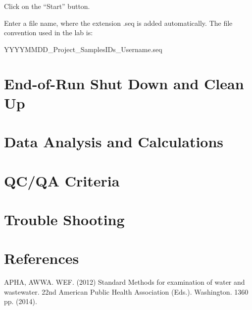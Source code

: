 \documentclass[12pt]{../SOP3_beta}\usepackage[]{graphicx}\usepackage[]{color}
\begin{document}
\NP Click on the ``Start'' button.

\NP Enter a file name, where the extension .seq is added automatically. The file convention used in the lab is:

\medskip

YYYYMMDD\_Project\_SamplesIDs\_Username.seq

\section{End-of-Run Shut Down and Clean Up}

\NP

\section{Data Analysis and Calculations}

\section{QC/QA Criteria}

\section{Trouble Shooting}

\section{References}

\NP APHA, AWWA. WEF. (2012) Standard Methods for examination of water and wastewater. 22nd American Public Health Association (Eds.). Washington. 1360 pp. (2014).
\end{document}
